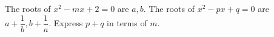 The roots of $x^2-mx+2=0$ are $a,b$. The roots of $x^2-px+q=0$ are $a+\dfrac{1}{b},b+\dfrac{1}{a}$. Express $p+q$ in terms of $m$.
